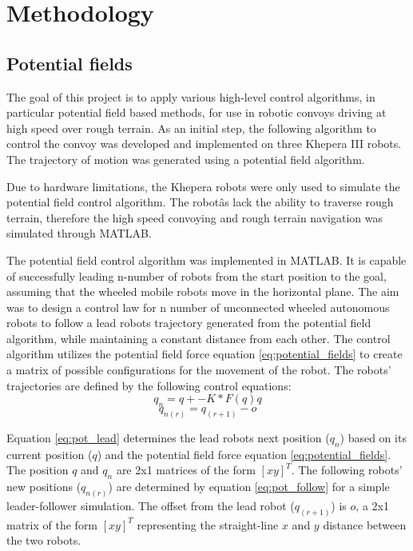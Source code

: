 \chapter{Methodology}
\section{Potential fields}
The goal of this project is to apply various high-level control algorithms, in particular potential field based methods, for use in robotic convoys driving at high speed over rough terrain. As an initial step, the following algorithm to control the convoy was developed and implemented on three Khepera III robots. The trajectory of motion was generated using a potential field algorithm.

Due to hardware limitations, the Khepera robots were only used to simulate the potential field control algorithm. The robotâs lack the ability to traverse rough terrain, therefore the high speed convoying and rough terrain navigation was simulated through MATLAB.

The potential field control algorithm was implemented in MATLAB. It is capable of successfully leading n-number of robots from the start position to the goal, assuming that the wheeled mobile robots move in the horizontal plane. The aim was to design a control law for n number of unconnected wheeled autonomous robots to follow a lead robots trajectory generated from the potential field algorithm, while maintaining a constant distance from each other. The control algorithm utilizes the potential field force equation \eqref{eq:potential_fields} to create a matrix of possible configurations for the movement of the robot. The robots' trajectories are defined by the following control equations:
\begin{equation} \label{eq:pot_lead}
	q_n=q+-K*F(q)q
\end{equation}
\begin{equation} \label{eq:pot_follow}
	q_{n(r)}=q_{(r+1)}-o
\end{equation}

Equation \eqref{eq:pot_lead} determines the lead robots next position ($q_n$) based on its current position ($q$) and the potential field force equation \eqref{eq:potential_fields}. The position $q$ and $q_n$ are 2x1 matrices of the form $[x y]^T$. The following robots' new positions ($q_{n(r)}$) are determined by equation \eqref{eq:pot_follow} for a simple leader-follower simulation. The offset from the lead robot ($q_{(r+1)}$) is $o$, a 2x1 matrix of the form $[x y]^T$ representing the straight-line $x$ and $y$ distance between the two robots.

